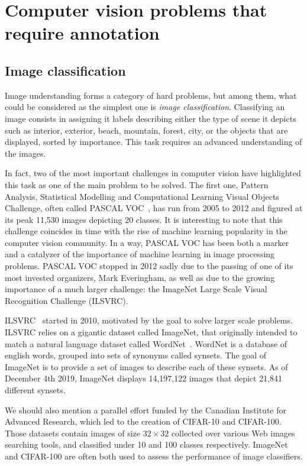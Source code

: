 \section{Computer vision problems that require annotation}%
\label{sec:cv_annot}

\subsection{Image classification}

Image understanding forms a category of hard problems, but among them,
what could be considered as the simplest one is \textit{image classification}.
Classifying an image consists in assigning it
labels describing either the type of scene it depicts
such as interior, exterior, beach, mountain, forest, city,
or the objects that are displayed, sorted by importance.
This task requires an advanced understanding of the images.

In fact, two of the most important challenges in computer vision
have highlighted this task as one of the main problem to be solved.
The first one, Pattern Analysis, Statistical Modelling and Computational
Learning Visual Objects Challenge, often called PASCAL VOC~\cite{Everingham10},
has run from 2005 to 2012 and figured at its peak 11,530 images depicting 20 classes.
It is interesting to note that this challenge coincides in time
with the rise of machine learning popularity in the computer vision community.
In a way, PASCAL VOC has been both a marker and a catalyzer of the importance
of machine learning in image processing problems.
PASCAL VOC stopped in 2012 sadly due to
the passing of one of its most invested organizers, Mark Everingham,
as well as due to the growing importance of a much larger challenge:
the ImageNet Large Scale Visual Recognition Challenge (ILSVRC).

ILSVRC~\cite{ILSVRC15} started in 2010,
motivated by the goal to solve larger scale problems.
ILSVRC relies on a gigantic dataset called ImageNet,
that originally intended to match a natural language
dataset called WordNet~\cite{miller1995wordnet}.
WordNet is a database of english words, grouped into sets of synonyms called synsets.
The goal of ImageNet is to provide a set of images to describe each of these synsets.
As of December 4th 2019, ImageNet displays 14,197,122 images that depict 21,841 different synsets.

We should also mention a parallel effort funded by
the Canadian Institute for Advanced Research,
which led to the creation of CIFAR-10 and CIFAR-100.
Those datasets contain images of size $32 \times 32$ collected
over various Web images searching tools,
and classified under 10 and 100 classes respectively.
ImageNet and CIFAR-100 are often both used to assess the performance of image classifiers.

